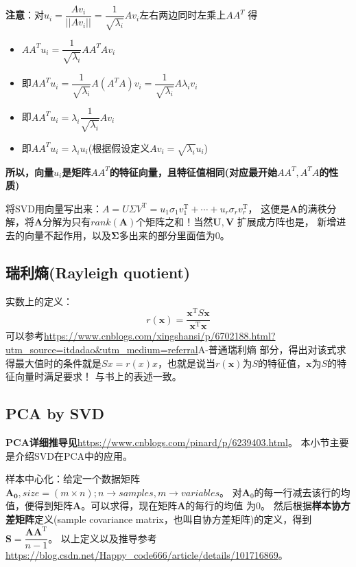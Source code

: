 \textbf{注意}：对$u_{i}=\dfrac{A v_{i}}{\left||A v_{i}\right||}=\dfrac{1}{\sqrt{\lambda_{i}}} A v_{i}$左右两边同时左乘上$AA^T$
    得
\begin{itemize}
    \item $AA^Tu_{i}=\dfrac{1}{\sqrt{\lambda_{i}}} AA^TA v_{i}$
    \item 即$AA^Tu_{i}=\dfrac{1}{\sqrt{\lambda_{i}}} A(A^TA) v_{i}=\dfrac{1}{\sqrt{\lambda_{i}}} A \lambda_i v_{i}$
    \item 即$AA^Tu_{i}=\lambda_i \dfrac{1}{\sqrt{\lambda_{i}}} A  v_{i}$
    \item 即$AA^Tu_{i}=\lambda_i u_i$(根据假设定义$A v_{i}=\sqrt{\lambda_{i}} u_{i}$)
\end{itemize}
\textbf{所以，向量$u_i$是矩阵$AA^T$的特征向量，且特征值相同(对应最开始$AA^T, A^TA$的性质)}

将SVD用向量写出来：$A=U \Sigma V^{\mathrm{T}}=u_{1} \sigma_{1} v_{1}^{\mathrm{T}}+\cdots+u_{r} \sigma_{r} v_{r}^{\mathrm{T}}$，
这便是$\bm{A}$的满秩分解，将$\bm{A}$分解为只有$rank(\bm{A})$个矩阵之和！当然$\bm{U,V}$ 扩展成方阵也是，
新增进去的向量不起作用，以及$\bm{\Sigma}$多出来的部分里面值为0。

\subsection{瑞利熵(Rayleigh quotient)}
实数上的定义：
$$r(\boldsymbol{x})=\dfrac{\boldsymbol{x}^{\mathrm{T}} S \boldsymbol{x}}{\boldsymbol{x}^{\mathrm{T}} \boldsymbol{x}}$$
可以参考\url{https://www.cnblogs.com/xingshansi/p/6702188.html?utm_source=itdadao&utm_medium=referral}A-普通瑞利熵
部分，得出对该式求得最大值时的条件就是$S x=r(x) x$，也就是说当$r(\bm{x})$为$S$的特征值，$\bm{x}$为$S$的特征向量时满足要求！
与书上的表述一致。

\subsection{PCA by SVD}
\textbf{PCA详细推导见}\url{https://www.cnblogs.com/pinard/p/6239403.html}。
本小节主要是介绍SVD在PCA中的应用。

样本中心化：给定一个数据矩阵$\bm{A_0},size=(m \times n); n \rightarrow samples, m \rightarrow variables$。
对$\bm{A}_0$的每一行减去该行的均值，便得到矩阵$\bm{A}$。可以求得，现在矩阵$\bm{A}$的每行的均值
为0。
然后根据\textbf{样本协方差矩阵}定义(sample covariance matrix，也叫自协方差矩阵)的定义，得到$\bm{S}=\dfrac{\bm{A} \bm{A}^{\mathrm{T}}}{n-1}$。
以上定义以及推导参考\url{https://blog.csdn.net/Happy_code666/article/details/101716869}。

